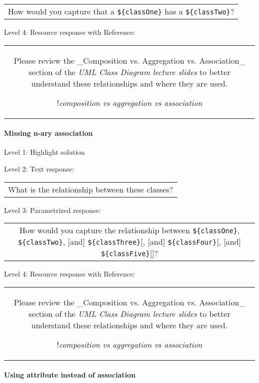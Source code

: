 \begin{tabular}{|c}
How would you capture that a \verb|${classOne}| has a \verb|${classTwo}|?
\end{tabular} \medskip

\noindent Level 4: Resource response with Reference:

\begin{tabular}{|c}
Please review the _Composition vs. Aggregation vs. Association_ section of 
the \textit{UML Class Diagram lecture slides} to 
better understand these relationships and where they are used.

!\textit{composition vs aggregation vs association}
\end{tabular} \medskip


\paragraph{Missing n-ary association}

\noindent Level 1: Highlight solution \medskip

\noindent Level 2: Text response: \medskip

\begin{tabular}{|c}
What is the relationship between these classes?
\end{tabular} \medskip

\noindent Level 3: Parametrized response: \medskip

\begin{tabular}{|c}
How would you capture the relationship between \verb|${classOne}|, \verb|${classTwo}|, [and] \verb|${classThree}|[, [and] \verb|${classFour}|[, [and] \verb|${classFive}|]]?
\end{tabular} \medskip

\noindent Level 4: Resource response with Reference:

\begin{tabular}{|c}
Please review the _Composition vs. Aggregation vs. Association_ section of 
the \textit{UML Class Diagram lecture slides} to 
better understand these relationships and where they are used.

!\textit{composition vs aggregation vs association}
\end{tabular} \medskip


\paragraph{Using attribute instead of association}

